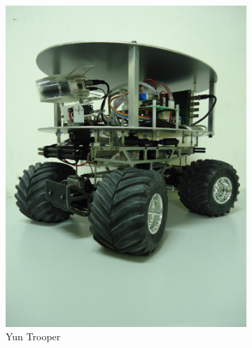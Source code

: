 \begin{figure}[h!]
	\centering
	\begin{subfigure}[b]{0.45\textwidth}
		\includegraphics[width=\textwidth]{figures/YunTrooper}
		\caption{Yun Trooper}
		\label{f:YunTrooperI}
	\end{subfigure}
	\begin{subfigure}[b]{0.45\textwidth}

\end{subfigure}
\end{figure}
